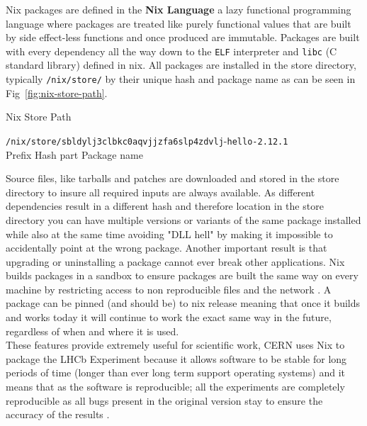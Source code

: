 Nix packages are defined in the \textbf{Nix Language} a lazy functional programming language where packages are treated like purely functional values that are built by side effect-less functions and once produced are immutable. Packages are built with every dependency all the way down to the \texttt{ELF} interpreter and \texttt{libc} (C standard library) defined in nix. All packages are installed in the store directory, typically \texttt{/nix/store/} by their unique hash and package name as can be seen in Fig~\ref{fig:nix-store-path}.

\begin{figureBox}[label={fig:nix-store-path}]{Nix Store Path}
\begin{tabbing}
\={\color{Purple}\texttt{/nix/store/}}\={\color{RoyalBlue}\texttt{sbldylj3clbkc0aqvjjzfa6slp4zdvlj}}-\={\color{Orange}\texttt{hello-2.12.1}} \\
\>\small{Prefix} \>\small {Hash part} \>\small {Package name}
\end{tabbing}
\end{figureBox}

Source files, like tarballs and patches are downloaded and stored in the store directory to insure all required inputs are always available. As different dependencies result in a different hash and therefore location in the store directory you can have multiple versions or variants of the same package installed while also at the same time avoiding "DLL hell" by making it impossible to accidentally point at the wrong package. Another important result is that upgrading or uninstalling a package cannot ever break other applications. Nix builds packages in a sandbox to ensure packages are built the same way on every machine by restricting access to non reproducible files and the network \cite{nixcon-sandboxs}. A package can be pinned (and should be) to nix release meaning that once it builds and works today it will continue to work the exact same way in the future, regardless of when and where it is used. \\ 


These features provide extremely useful for scientific work, CERN uses Nix to package the LHCb Experiment because it allows software to be stable for long periods of time (longer than ever long term support operating systems) and it means that as the software is reproducible; all the experiments are completely reproducible as all bugs present in the original version stay to ensure the accuracy of the results \cite{LHCbNix}. \\


